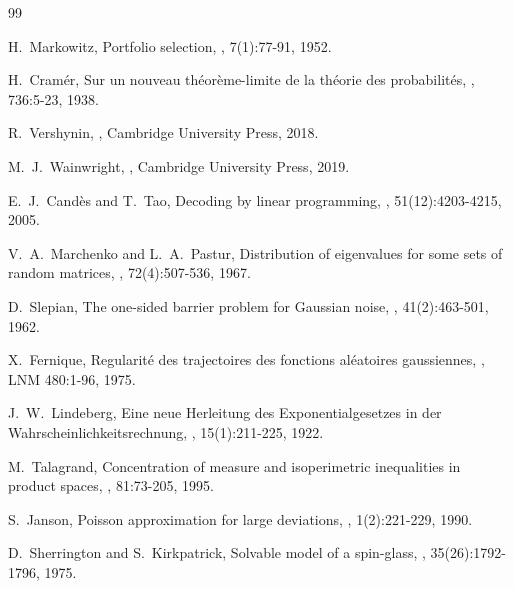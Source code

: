 \documentclass[11pt]{article}
\begin{document}

\begin{thebibliography}{99}

H.~Markowitz,
\newblock Portfolio selection,
, 7(1):77-91, 1952.

H.~Cram\'er,
\newblock Sur un nouveau th\'eor\`eme-limite de la th\'eorie des probabilit\'es,
, 736:5-23, 1938.

R.~Vershynin,
,
\newblock Cambridge University Press, 2018.

M.~J.~Wainwright,
,
\newblock Cambridge University Press, 2019.

E.~J.~Cand\`es and T.~Tao,
\newblock Decoding by linear programming,
, 51(12):4203-4215, 2005.

V.~A.~Marchenko and L.~A.~Pastur,
\newblock Distribution of eigenvalues for some sets of random matrices,
, 72(4):507-536, 1967.

D.~Slepian,
\newblock The one-sided barrier problem for Gaussian noise,
, 41(2):463-501, 1962.

X.~Fernique,
\newblock Regularit\'e des trajectoires des fonctions al\'eatoires gaussiennes,
, LNM 480:1-96, 1975.

J.~W.~Lindeberg,
\newblock Eine neue Herleitung des Exponentialgesetzes in der Wahrscheinlichkeitsrechnung,
, 15(1):211-225, 1922.

M.~Talagrand,
\newblock Concentration of measure and isoperimetric inequalities in product spaces,
, 81:73-205, 1995.

S.~Janson,
\newblock Poisson approximation for large deviations,
, 1(2):221-229, 1990.

D.~Sherrington and S.~Kirkpatrick,
\newblock Solvable model of a spin-glass,
, 35(26):1792-1796, 1975.


\end{thebibliography}
\end{document}
